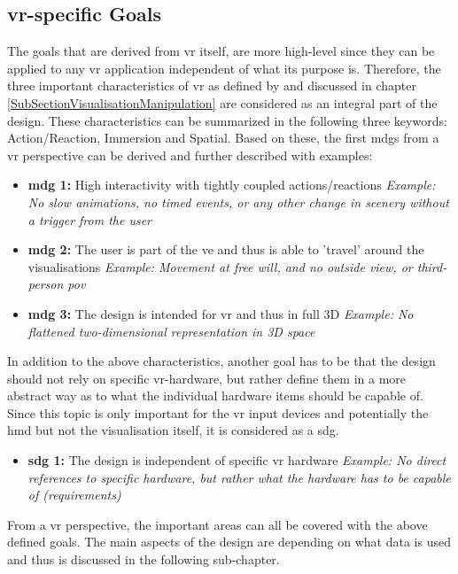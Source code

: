 \subsection{\gls{vr}-specific Goals}

The goals that are derived from \gls{vr} itself, are more high-level since they can be applied to any \gls{vr} application independent of what its purpose is. Therefore, the three important characteristics of \gls{vr} as defined by \cite{Stone1994} and discussed in chapter \ref{SubSectionVisualisationManipulation} are considered as an integral part of the design. These characteristics can be summarized in the following three keywords: Action/Reaction, Immersion and Spatial. Based on these, the first \glspl{mdg} from a \gls{vr} perspective can be derived and further described with examples:
\begin{itemize}[noitemsep,nolistsep]
	\item \textbf{\gls{mdg} 1:} High interactivity with tightly coupled actions/reactions \newline
		\textit{Example: No slow animations, no timed events, or any other change in scenery without a trigger from the user}
	\item \textbf{\gls{mdg} 2:} The user is part of the \gls{ve} and thus is able to 'travel' around the visualisations \newline
		\textit{Example: Movement at free will, and no outside view, or third-person \gls{pov}}
	\item \textbf{\gls{mdg} 3:} The design is intended for \gls{vr} and thus in full 3D \newline
		\textit{Example: No flattened two-dimensional representation in 3D space}
\end{itemize}
In addition to the above characteristics, another goal has to be that the design should not rely on specific \gls{vr}-hardware, but rather define them in a more abstract way as to what the individual hardware items should be capable of. Since this topic is only important for the \gls{vr} input devices and potentially the \gls{hmd} but not the visualisation itself, it is considered as a \gls{sdg}.
\begin{itemize}[noitemsep,nolistsep]
	\item \textbf{\gls{sdg} 1:} The design is independent of specific \gls{vr} hardware \newline
	\textit{Example: No direct references to specific hardware, but rather what the hardware has to be capable of (requirements)}
\end{itemize}
From a \gls{vr} perspective, the important areas can all be covered with the above defined goals. The main aspects of the design are depending on what data is used and thus is discussed in the following sub-chapter.


